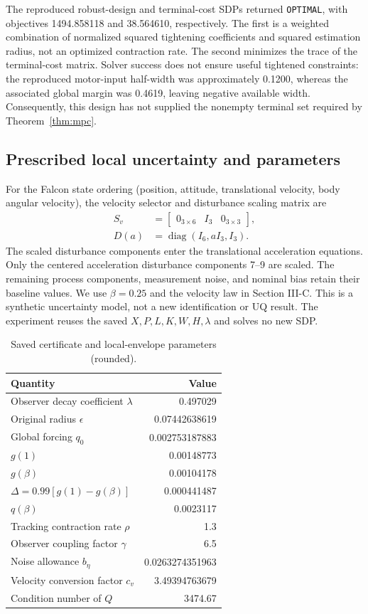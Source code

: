 \documentclass[11pt,a4paper]{article}
\numberwithin{equation}{section}
\theoremstyle{remark}\newtheorem{remark}{Remark}
\newcommand{\diag}{\operatorname{diag}}
\begin{document}
The reproduced robust-design and terminal-cost SDPs returned \texttt{OPTIMAL}, with objectives 1494.858118 and 38.564610, respectively. The first is a weighted combination of normalized squared tightening coefficients and squared estimation radius, not an optimized contraction rate. The second minimizes the trace of the terminal-cost matrix. Solver success does not ensure useful tightened constraints: the reproduced motor-input half-width was approximately 0.1200, whereas the associated global margin was 0.4619, leaving negative available width. Consequently, this design has not supplied the nonempty terminal set required by Theorem~\ref{thm:mpc}.

\subsection{Prescribed local uncertainty and parameters}\label{sec:falcon-uncertainty}
For the Falcon state ordering (position, attitude, translational velocity, body angular velocity), the velocity selector and disturbance scaling matrix are
\[
\begin{aligned}
S_v&=\begin{bmatrix}0_{3\times6}&I_3&0_{3\times3}\end{bmatrix},\\
D(a)&=\diag(I_6,aI_3,I_3).
\end{aligned}
\]
The scaled disturbance components enter the translational acceleration equations.
Only the centered acceleration disturbance components 7--9 are scaled. The remaining process components, measurement noise, and nominal bias retain their baseline values. We use $\beta=0.25$ and the velocity law in Section III-C. This is a synthetic uncertainty model, not a new identification or UQ result. The experiment reuses the saved $X,P,L,K,W,H,\lambda$ and solves no new SDP.
\begin{table}[htbp]\centering
\caption{Saved certificate and local-envelope parameters (rounded).}
\setlength{\tabcolsep}{4pt}
\begin{tabular}{lr}\toprule
Quantity & Value\\\midrule
Observer decay coefficient $\lambda$ & 0.497029\\
Original radius $\epsilon$ & 0.07442638619\\
Global forcing $q_0$ & 0.002753187883\\
$g(1)$ & 0.00148773\\
$g(\beta)$ & 0.00104178\\
$\Delta=0.99[g(1)-g(\beta)]$ & 0.000441487\\
$q(\beta)$ & 0.0023117\\
Tracking contraction rate $\rho$ & 1.3\\
Observer coupling factor $\gamma$ & 6.5\\
Noise allowance $b_\eta$ & 0.0263274351963\\
Velocity conversion factor $c_v$ & 3.49394763679\\
Condition number of $Q$ & 3474.67\\\bottomrule
\end{tabular}\label{tab:parameters}
\end{table}
\end{document}
